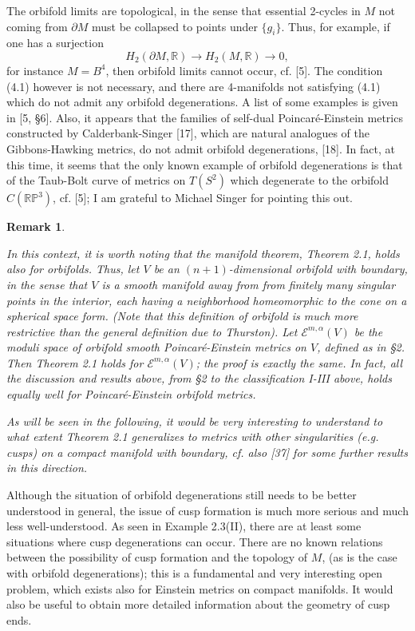\documentclass[11pt,amsfonts]{amsart}
\newtheorem{remark}[theorem]{Remark}
\begin{document}
 The orbifold limits are topological, in the sense that essential 
2-cycles in $M$ not coming from $\partial M$ must be collapsed to 
points under $\{g_{i}\}$. Thus, for example, if one has a surjection
\begin{equation} \label{e4.1}
H_{2}(\partial M, {\mathbb R} ) \rightarrow  H_{2}(M, {\mathbb R} ) 
\rightarrow  0, 
\end{equation}
for instance $M = B^{4}$, then orbifold limits cannot occur, cf. [5]. The 
condition (4.1) however is not necessary, and there are 4-manifolds not 
satisfying (4.1) which do not admit any orbifold degenerations. A list of 
some examples is given in [5, \S 6]. Also, it appears that the families of 
self-dual Poincar\'e-Einstein metrics constructed by Calderbank-Singer [17], 
which are natural analogues of the Gibbons-Hawking metrics, do not admit 
orbifold degenerations, [18]. In fact, at this time, it seems that the only 
known example of orbifold degenerations is that of the Taub-Bolt curve of 
metrics on $T(S^{2})$ which degenerate to the orbifold $C({\mathbb R}{\mathbb P}^{3})$, 
cf. [5]; I am grateful to Michael Singer for pointing this out. 

\begin{remark} \label{r4.1}
{\rm In this context, it is worth noting that the manifold theorem, 
Theorem 2.1, holds also for orbifolds. Thus, let $V$ be an $(n+1)$-dimensional 
orbifold with boundary, in the sense that $V$ is a smooth manifold away from
from finitely many singular points in the interior, each having a neighborhood 
homeomorphic to the cone on a spherical space form. (Note that this definition 
of orbifold is much more restrictive than the general definition due to 
Thurston). Let ${\mathcal E}^{m,\alpha}(V)$ be the moduli space of orbifold smooth 
Poincar\'e-Einstein metrics on $V$, defined as in \S 2. Then Theorem 2.1 holds 
for ${\mathcal E}^{m,\alpha}(V)$; the proof is exactly the same. In fact, all 
the discussion and results above, from \S 2 to the classification I-III above, 
holds equally well for Poincar\'e-Einstein orbifold metrics. 

  As will be seen in the following, it would be very interesting to understand 
to what extent Theorem 2.1 generalizes to metrics with other singularities (e.g. 
cusps) on a compact manifold with boundary, cf. also [37] for some further 
results in this direction. }
\end{remark}

 Although the situation of orbifold degenerations still needs to be better 
understood in general, the issue of cusp formation is much more serious and much 
less well-understood. As seen in Example 2.3(II), there are at least some 
situations where cusp degenerations can occur. There are no known relations 
between the possibility of cusp formation and the topology of $M$, (as is 
the case with orbifold degenerations); this is a fundamental and very interesting 
open problem, which exists also for Einstein metrics on compact manifolds. 
It would also be useful to obtain more detailed information about 
the geometry of cusp ends.
\end{document}
